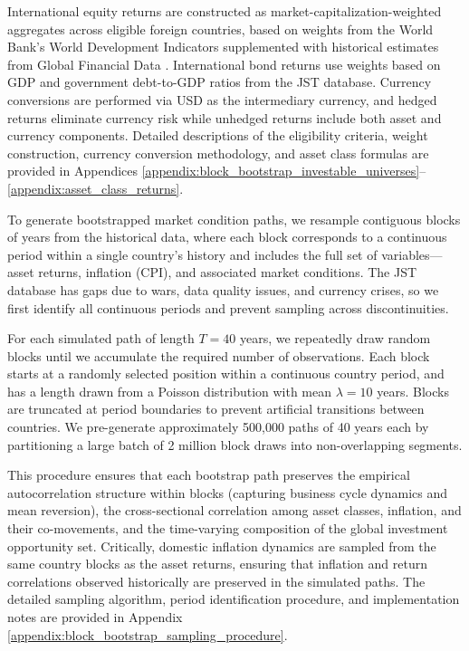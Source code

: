 \documentclass[11pt]{article}
\begin{document}
International equity returns are constructed as market-capitalization-weighted aggregates across eligible foreign countries, based on weights from the World Bank's World Development Indicators \parencite{data__worldbankMktCap} supplemented with historical estimates from Global Financial Data \parencite[sourced from][]{data__gfdMktCap}. International bond returns use weights based on GDP and government debt-to-GDP ratios from the JST database. Currency conversions are performed via USD as the intermediary currency, and hedged returns eliminate currency risk while unhedged returns include both asset and currency components. Detailed descriptions of the eligibility criteria, weight construction, currency conversion methodology, and asset class formulas are provided in Appendices \ref{appendix:block_bootstrap_investable_universes}--\ref{appendix:asset_class_returns}.

To generate bootstrapped market condition paths, we resample contiguous blocks of years from the historical data, where each block corresponds to a continuous period within a single country's history and includes the full set of variables---asset returns, inflation (CPI), and associated market conditions. The JST database has gaps due to wars, data quality issues, and currency crises, so we first identify all continuous periods and prevent sampling across discontinuities. 

For each simulated path of length $T = 40$ years, we repeatedly draw random blocks until we accumulate the required number of observations. Each block starts at a randomly selected position within a continuous country period, and has a length drawn from a Poisson distribution with mean $\lambda = 10$ years. Blocks are truncated at period boundaries to prevent artificial transitions between countries. We pre-generate approximately 500,000 paths of 40 years each by partitioning a large batch of 2 million block draws into non-overlapping segments.

This procedure ensures that each bootstrap path preserves the empirical autocorrelation structure within blocks (capturing business cycle dynamics and mean reversion), the cross-sectional correlation among asset classes, inflation, and their co-movements, and the time-varying composition of the global investment opportunity set. Critically, domestic inflation dynamics are sampled from the same country blocks as the asset returns, ensuring that inflation and return correlations observed historically are preserved in the simulated paths. The detailed sampling algorithm, period identification procedure, and implementation notes are provided in Appendix \ref{appendix:block_bootstrap_sampling_procedure}.
\end{document}
